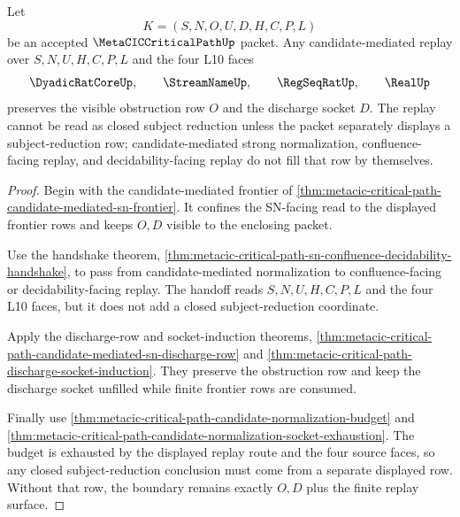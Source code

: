 \begin{theorem}
\label{thm:metacic-critical-path-candidate-mediated-sn-subject-reduction-boundary}
Let
$$
K=(S,N,O,U,D,H,C,P,L)
$$
be an accepted $\MetaCICCriticalPathUp$ packet. Any candidate-mediated replay over $S,N,U,H,C,P,L$ and the four L10 faces
$$
\DyadicRatCoreUp,\qquad
\StreamNameUp,\qquad
\RegSeqRatUp,\qquad
\RealUp
$$
preserves the visible obstruction row $O$ and the discharge socket $D$. The replay cannot be read as closed subject reduction unless the packet separately displays a subject-reduction row; candidate-mediated strong normalization, confluence-facing replay, and decidability-facing replay do not fill that row by themselves.
\end{theorem}
\begin{proof}
Begin with the candidate-mediated frontier of \autoref{thm:metacic-critical-path-candidate-mediated-sn-frontier}. It confines the SN-facing read to the displayed frontier rows and keeps $O,D$ visible to the enclosing packet.

Use the handshake theorem, \autoref{thm:metacic-critical-path-sn-confluence-decidability-handshake}, to pass from candidate-mediated normalization to confluence-facing or decidability-facing replay. The handoff reads $S,N,U,H,C,P,L$ and the four L10 faces, but it does not add a closed subject-reduction coordinate.

Apply the discharge-row and socket-induction theorems, \autoref{thm:metacic-critical-path-candidate-mediated-sn-discharge-row} and \autoref{thm:metacic-critical-path-discharge-socket-induction}. They preserve the obstruction row and keep the discharge socket unfilled while finite frontier rows are consumed.

Finally use \autoref{thm:metacic-critical-path-candidate-normalization-budget} and \autoref{thm:metacic-critical-path-candidate-normalization-socket-exhaustion}. The budget is exhausted by the displayed replay route and the four source faces, so any closed subject-reduction conclusion must come from a separate displayed row. Without that row, the boundary remains exactly $O,D$ plus the finite replay surface.
\end{proof}

